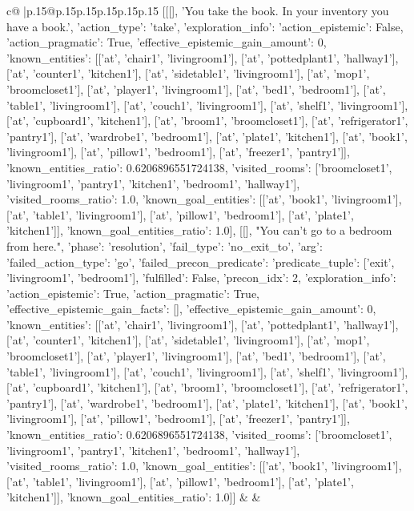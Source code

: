 \documentclass{article}
\begin{document}
{\begin{supertabular}{c@{$\;$}|p{.15\linewidth}@{}p{.15\linewidth}p{.15\linewidth}p{.15\linewidth}p{.15\linewidth}p{.15\linewidth}}
{{{	 [[[], 'You take the book. In your inventory you have a book.', {'action_type': 'take', 'exploration_info': {'action_epistemic': False, 'action_pragmatic': True, 'effective_epistemic_gain_amount': 0, 'known_entities': [['at', 'chair1', 'livingroom1'], ['at', 'pottedplant1', 'hallway1'], ['at', 'counter1', 'kitchen1'], ['at', 'sidetable1', 'livingroom1'], ['at', 'mop1', 'broomcloset1'], ['at', 'player1', 'livingroom1'], ['at', 'bed1', 'bedroom1'], ['at', 'table1', 'livingroom1'], ['at', 'couch1', 'livingroom1'], ['at', 'shelf1', 'livingroom1'], ['at', 'cupboard1', 'kitchen1'], ['at', 'broom1', 'broomcloset1'], ['at', 'refrigerator1', 'pantry1'], ['at', 'wardrobe1', 'bedroom1'], ['at', 'plate1', 'kitchen1'], ['at', 'book1', 'livingroom1'], ['at', 'pillow1', 'bedroom1'], ['at', 'freezer1', 'pantry1']], 'known_entities_ratio': 0.6206896551724138, 'visited_rooms': ['broomcloset1', 'livingroom1', 'pantry1', 'kitchen1', 'bedroom1', 'hallway1'], 'visited_rooms_ratio': 1.0, 'known_goal_entities': [['at', 'book1', 'livingroom1'], ['at', 'table1', 'livingroom1'], ['at', 'pillow1', 'bedroom1'], ['at', 'plate1', 'kitchen1']], 'known_goal_entities_ratio': 1.0}}], [[], "You can't go to a bedroom from here.", {'phase': 'resolution', 'fail_type': 'no_exit_to', 'arg': {'failed_action_type': 'go', 'failed_precon_predicate': {'predicate_tuple': ['exit', 'livingroom1', 'bedroom1'], 'fulfilled': False, 'precon_idx': 2}}, 'exploration_info': {'action_epistemic': True, 'action_pragmatic': True, 'effective_epistemic_gain_facts': [], 'effective_epistemic_gain_amount': 0, 'known_entities': [['at', 'chair1', 'livingroom1'], ['at', 'pottedplant1', 'hallway1'], ['at', 'counter1', 'kitchen1'], ['at', 'sidetable1', 'livingroom1'], ['at', 'mop1', 'broomcloset1'], ['at', 'player1', 'livingroom1'], ['at', 'bed1', 'bedroom1'], ['at', 'table1', 'livingroom1'], ['at', 'couch1', 'livingroom1'], ['at', 'shelf1', 'livingroom1'], ['at', 'cupboard1', 'kitchen1'], ['at', 'broom1', 'broomcloset1'], ['at', 'refrigerator1', 'pantry1'], ['at', 'wardrobe1', 'bedroom1'], ['at', 'plate1', 'kitchen1'], ['at', 'book1', 'livingroom1'], ['at', 'pillow1', 'bedroom1'], ['at', 'freezer1', 'pantry1']], 'known_entities_ratio': 0.6206896551724138, 'visited_rooms': ['broomcloset1', 'livingroom1', 'pantry1', 'kitchen1', 'bedroom1', 'hallway1'], 'visited_rooms_ratio': 1.0, 'known_goal_entities': [['at', 'book1', 'livingroom1'], ['at', 'table1', 'livingroom1'], ['at', 'pillow1', 'bedroom1'], ['at', 'plate1', 'kitchen1']], 'known_goal_entities_ratio': 1.0}}]] 
	  } 
	   } 
	   } 
	 & & \\ 
 


\end{supertabular}}
\end{document}
